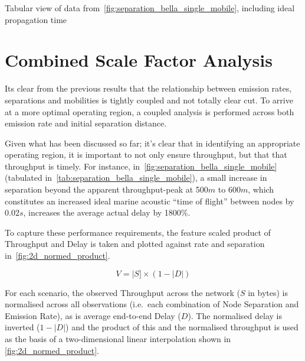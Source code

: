 \begin{table}[h]
	\caption{Tabular view of data from~\autoref{fig:separation_bella_single_mobile}, including ideal propagation time} \label{tab:separation_bella_single_mobile}
	\begin{center}
    
	\end{center}
\end{table}


\clearpage

\section{Combined Scale Factor Analysis}

Its clear from the previous results that the relationship between emission rates, separations and mobilities is tightly coupled and not totally clear cut. 
To arrive at a more optimal operating region, a coupled analysis is performed across both emission rate and initial separation distance.

Given what has been discussed so far; it's clear that in identifying an appropriate operating region, it is important to not only ensure throughput, but that that throughput is timely.
For instance, in~\autoref{fig:separation_bella_single_mobile} (tabulated in~\autoref{tab:separation_bella_single_mobile}), a small increase in separation beyond the apparent throughput-peak at 500$m$ to 600$m$, which constitutes an increased ideal marine acoustic ``time of flight'' between nodes by 0.02$s$, increases the average actual delay by 1800\%. 

To capture these performance requirements, the feature scaled product of Throughput and Delay is taken and plotted against rate and separation in~\autoref{fig:2d_normed_product}.

\begin{equation}
  V = |S] \times (1 - |D|)
  \label{eq:normed_product}
\end{equation}

For each scenario, the observed Throughput across the network ($S$ in bytes) is normalised across all observations (i.e.\ each combination of Node Separation and Emission Rate), as is average end-to-end Delay ($D$). The normalised delay is inverted ($1-|D|$) and the product of this and the normalised throughput is used as the basis of a two-dimensional linear interpolation shown in \autoref{fig:2d_normed_product}.



